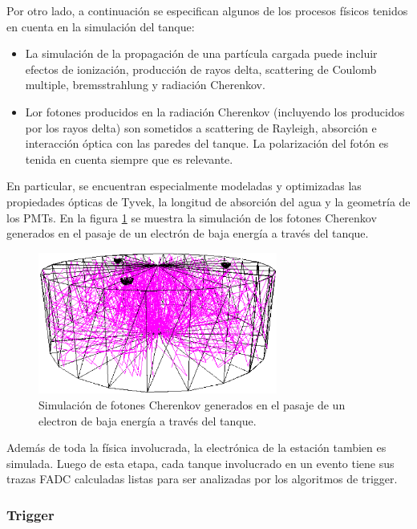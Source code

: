 		Por otro lado, a continuaci\'on se especifican algunos de los procesos f\'isicos tenidos en cuenta en la simulaci\'on del tanque:
		\begin{itemize}
		\item La simulaci\'on de la propagaci\'on de una part\'icula cargada puede incluir efectos de ionizaci\'on, producci\'on de rayos delta, scattering de Coulomb multiple, bremsstrahlung y radiaci\'on Cherenkov.
		\item Lor fotones producidos en la radiaci\'on Cherenkov (incluyendo los producidos por los rayos delta) son sometidos a scattering de Rayleigh, absorci\'on e interacci\'on \'optica con las paredes del tanque. La polarizaci\'on del fot\'on es tenida en cuenta siempre que es relevante.
		\end{itemize}
		En particular, se encuentran especialmente modeladas y optimizadas las propiedades \'opticas de Tyvek, la longitud de absorci\'on del agua y la geometr\'ia de los PMTs.
		En la figura \ref{fig:cher_tank_sim} se muestra la simulaci\'on de los fotones Cherenkov generados en el pasaje de un electr\'on de baja energ\'ia a trav\'es del tanque.
		\begin{figure}[h!]
			\begin{center}
			\includegraphics[width=0.7\textwidth]{fig/simulacionAuger/cher_tank_sim}
			\caption{Simulaci\'on de fotones Cherenkov generados en el pasaje de un electron de baja energ\'ia a trav\'es del tanque.}
			\label{fig:cher_tank_sim}
			\end{center}
		\end{figure}
		
		Adem\'as de toda la f\'isica involucrada, la electr\'onica de la estaci\'on tambien es simulada.
		Luego de esta etapa, cada tanque involucrado en un evento tiene sus trazas FADC calculadas listas para ser analizadas por los algoritmos de trigger.
		
		\subsubsection{Trigger}
		
